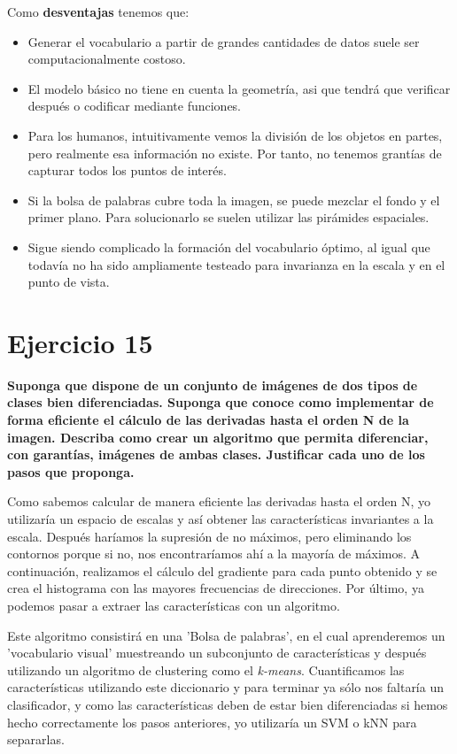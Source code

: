 \documentclass[11pt,a4paper]{article}
\begin{document}
Como \textbf{desventajas} tenemos que:
\begin{itemize}
	\item Generar el vocabulario a partir de grandes cantidades de datos suele ser computacionalmente costoso.
	\item El modelo básico no tiene en cuenta la geometría, asi que tendrá que verificar después o codificar mediante funciones.
	\item Para los humanos, intuitivamente vemos la división de los objetos en partes, pero realmente esa información no existe. Por tanto, no
	tenemos	grantías de capturar todos los puntos de interés.
	\item Si la bolsa de palabras cubre toda la imagen, se puede mezclar el fondo y el primer plano. Para solucionarlo se suelen utilizar las
	pirámides espaciales.
	\item Sigue siendo complicado la formación del vocabulario óptimo, al igual que todavía no ha sido ampliamente testeado para invarianza
	en la escala y en el punto de vista.
\end{itemize}


\section*{Ejercicio 15}

\textbf{Suponga que dispone de un conjunto de imágenes de dos tipos de clases bien diferenciadas. Suponga que conoce como implementar de forma
eficiente el cálculo de las derivadas hasta el orden N de la imagen. Describa como crear un algoritmo que permita diferenciar, con garantías,
imágenes de ambas clases. Justificar cada uno de los pasos que proponga.}

Como sabemos calcular de manera eficiente las derivadas hasta el orden N, yo utilizaría un espacio de escalas y así obtener las características
invariantes a la escala. Después haríamos la supresión de no máximos, pero eliminando los contornos porque si no, nos encontraríamos ahí a la
mayoría de máximos. A continuación, realizamos el cálculo del gradiente para cada punto obtenido y se crea el histograma con las mayores
frecuencias de direcciones. Por último, ya podemos pasar a extraer las características con un algoritmo.

Este algoritmo consistirá en una 'Bolsa de palabras', en el cual aprenderemos un 'vocabulario visual' muestreando un subconjunto de características
y después utilizando un algoritmo de clustering como el \textit{k-means}. Cuantificamos las características utilizando este diccionario y para terminar
ya sólo nos faltaría un clasificador, y como las características deben de estar bien diferenciadas si hemos hecho correctamente los pasos anteriores,
yo utilizaría un SVM o kNN para separarlas.
\end{document}
